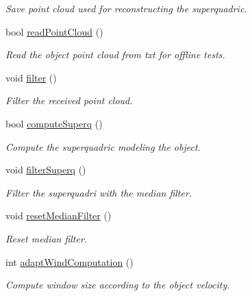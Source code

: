\begin{DoxyCompactItemize}
\begin{DoxyCompactList}\small\item\em Save point cloud used for reconstructing the superquadric. \end{DoxyCompactList}\item 
\mbox{\label{classSuperqComputation_a39716be08b79ce6ff2ebcb5818fac75e}} 
bool \mbox{\hyperlink{classSuperqComputation_a39716be08b79ce6ff2ebcb5818fac75e}{read\+Point\+Cloud}} ()
\begin{DoxyCompactList}\small\item\em Read the object point cloud from txt for offline tests. \end{DoxyCompactList}\item 
\mbox{\label{classSuperqComputation_a33f9e5ffc074bcf0235d2f49190a60c3}} 
void \mbox{\hyperlink{classSuperqComputation_a33f9e5ffc074bcf0235d2f49190a60c3}{filter}} ()
\begin{DoxyCompactList}\small\item\em Filter the received point cloud. \end{DoxyCompactList}\item 
bool \mbox{\hyperlink{classSuperqComputation_a99887a4fd19d25a3b1ebf46d63558397}{compute\+Superq}} ()
\begin{DoxyCompactList}\small\item\em Compute the superquadric modeling the object. \end{DoxyCompactList}\item 
\mbox{\label{classSuperqComputation_aaf15f0e8aecc808c945ca4036be8c249}} 
void \mbox{\hyperlink{classSuperqComputation_aaf15f0e8aecc808c945ca4036be8c249}{filter\+Superq}} ()
\begin{DoxyCompactList}\small\item\em Filter the superquadri with the median filter. \end{DoxyCompactList}\item 
\mbox{\label{classSuperqComputation_a49c6ca5d5a0d4f0a9a065e0ad448a3e2}} 
void \mbox{\hyperlink{classSuperqComputation_a49c6ca5d5a0d4f0a9a065e0ad448a3e2}{reset\+Median\+Filter}} ()
\begin{DoxyCompactList}\small\item\em Reset median filter. \end{DoxyCompactList}\item 
\mbox{\label{classSuperqComputation_a8d35478d678ddd1711ca63a7e66a13ac}} 
int \mbox{\hyperlink{classSuperqComputation_a8d35478d678ddd1711ca63a7e66a13ac}{adapt\+Wind\+Computation}} ()
\begin{DoxyCompactList}\small\item\em Compute window size according to the object velocity. \end{DoxyCompactList}\item 

\end{DoxyCompactItemize}
